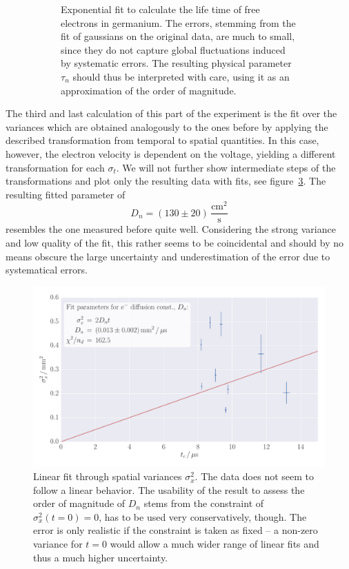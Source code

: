 \begin{figure}
\begin{subfigure}[b]{\pltw}
        \caption{
            Exponential fit to calculate the life time of free electrons in germanium. 
            The errors, stemming from the fit of gaussians on the original data, 
            are much to small, since they do not capture global fluctuations induced 
            by systematic errors. The resulting physical parameter $\tau_n$ should 
            thus be interpreted with care, using it as an approximation of the 
            order of magnitude. 
            }
        \label{fig:h_s_tau_U}
    \end{subfigure}
    \caption{
        }
    \label{fig:h_s_mu_e_tau_U}
\end{figure}
The third and last calculation of this part of the experiment is the fit over the 
variances which are obtained analogously to the ones before by applying the 
described transformation from temporal to spatial quantities. 
In this case, however, the electron velocity is dependent on 
the voltage, yielding a different transformation for each $\sigma_t$. 
We will not further show intermediate steps of the transformations and 
plot only the resulting data with fits, see figure~\ref{fig:h_s_D_U}. 
The resulting fitted parameter of 
\begin{equation}
    D_n = (130 \pm 20)\, \mathrm{\frac{cm^2}{s}} 
\end{equation}
resembles the one measured before quite well. Considering the 
strong variance and low quality of the fit, this rather seems to 
be coincidental and should by no means obscure the large uncertainty 
and underestimation of the error due to systematical errors. 
\begin{figure}
    \includegraphics[width=1.0\textwidth]{figures/haynes_shockley_D_U}
    \caption{
        Linear fit through spatial variances $\sigma_x^2$. 
        The data does not seem to follow a linear behavior. 
        The usability of the result to assess the order of magnitude 
        of $D_n$ stems from the constraint of $\sigma_x^2(t = 0) = 0$, 
        has to be used very conservatively, though. The error 
        is only realistic if the constraint is taken as fixed -- 
        a non-zero variance for $t = 0$ would allow a much wider range of
        linear fits and thus a much higher uncertainty. 
        }
    \label{fig:h_s_D_U}
\end{figure}

\FloatBarrier
